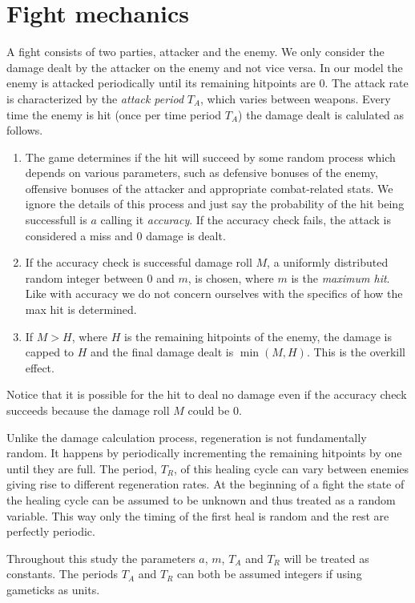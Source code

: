 \section{Fight mechanics}\label{chap:fightMechanics}
A fight consists of two parties, attacker and the enemy. We only consider the damage dealt by the attacker on the enemy and not vice versa. In our model the enemy is attacked periodically until its remaining hitpoints are 0. The attack rate is characterized by the \textit{attack period} $T_A$, which varies between weapons.
Every time the enemy is hit (once per time period $T_A$) the damage dealt is calulated as follows.
\begin{enumerate}
	\item The game determines if the hit will succeed by some random process which depends on various parameters, such as defensive bonuses of the enemy, offensive bonuses of the attacker and appropriate combat-related stats. We ignore the details of this process and just say the probability of the hit being successfull is $a$ calling it \textit{accuracy}. If the accuracy check fails, the attack is considered a miss and 0 damage is dealt.
	\item If the accuracy check is successful damage roll $M$, a uniformly distributed random integer between 0 and $m$, is chosen, where $m$ is the \textit{maximum hit}. Like with accuracy we do not concern ourselves with the specifics of how the max hit is determined.
    \item If $M > H$, where $H$ is the remaining hitpoints of the enemy, the damage is capped to $H$ and the final damage dealt is $\min(M,H)$. This is the overkill effect.
\end{enumerate}
Notice that it is possible for the hit to deal no damage even if the accuracy check succeeds because the damage roll $M$ could be 0.

Unlike the damage calculation process, regeneration is not fundamentally random. It happens by periodically incrementing the remaining hitpoints by one until they are full. The period, $T_R$, of this healing cycle can vary between enemies giving rise to different regeneration rates. At the beginning of a fight the state of the healing cycle can be assumed to be unknown and thus treated as a random variable. This way only the timing of the first heal is random and the rest are perfectly periodic.

Throughout this study the parameters $a$, $m$, $T_A$ and $T_R$ will be treated as constants. The periods $T_A$ and $T_R$ can both be assumed integers if using gameticks as units.
